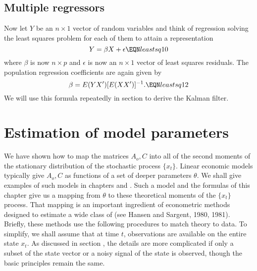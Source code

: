   \subsection{Multiple regressors}
Now let $Y$ be an $n \times 1$ vector of random variables and
think of regression solving the least squares problem for each of
them to attain a representation
$$ Y = \beta X  + \epsilon \EQN leastsq10 $$
where $\beta$ is now $n \times p$ and $\epsilon$ is now an $n
\times 1$ vector of least squares residuals.  The population
regression coefficients are again given by
$$ \beta = E(Y X') [E(X X')]^{-1} . \EQN leastsq12 $$
We will use this formula repeatedly in section  to derive
the Kalman filter.%




\section{Estimation of model parameters}\label{sec:estimation1}%
We have shown  how to map the matrices $A_o, C$
into all of the second moments of the
stationary distribution of the stochastic process $\{x_t\}$.
Linear economic models typically give $A_o, C$ as functions
of a set of deeper parameters $\theta$. We shall
give examples of  such models in chapters  and
.
Such a model and the formulas
of this chapter give us a mapping from $\theta$ to these theoretical moments
of the $\{x_t\}$ process.  That  mapping
 is an  important ingredient of econometric methods designed to estimate a
wide class of  (see
Hansen and Sargent, 1980, 1981).
%
 Briefly,
these methods use the following procedures to match theory to data.   To simplify, we shall assume that at time $t$,
observations are
available on the entire state $x_t$. As discussed in section ,
 the details are more complicated
if only a subset of the state vector or a noisy signal of the state is observed,
though the basic principles remain the same.

